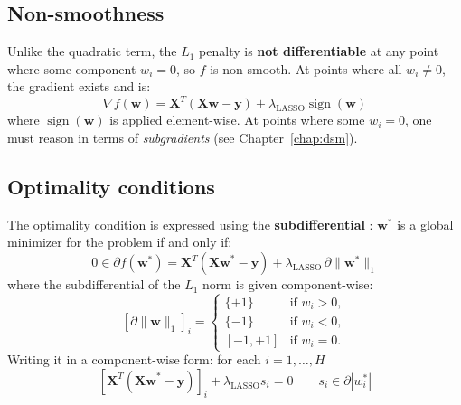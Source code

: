 \subsection{Non-smoothness}
Unlike the quadratic term, the $L_1$ penalty is \textbf{not differentiable} \cite[Slide 4]{frangioni-slides-nonsmooth} at any point where some component $w_i = 0$, so $f$ is non-smooth.
At points where all $w_i \neq 0$, the gradient exists and is:
$$
\nabla f(\mathbf{w}) = \mathbf{X}^T(\mathbf{Xw} - \mathbf{y}) + \lambda_{\text{LASSO}} \operatorname{sign}(\mathbf{w})
$$
where $\operatorname{sign}(\mathbf{w})$ is applied element-wise.
At points where some $w_i = 0$, one must reason in terms of
\textit{subgradients} (see Chapter~\ref{chap:dsm}).

\subsection{Optimality conditions}
\label{sec:intro_optimality}
The optimality condition is expressed
using the \textbf{subdifferential} \cite[Slide 5]{frangioni-slides-nonsmooth}: $\mathbf{w}^*$ is a global minimizer for the problem if and
only if:
$$
0 \in \partial f(\mathbf{w}^*) = \mathbf{X}^T(\mathbf{Xw}^* - \mathbf{y})
+ \lambda_{\text{LASSO}} \, \partial\|\mathbf{w}^*\|_1
$$
where the subdifferential of the $L_1$ norm is given component-wise:
$$
[\partial \|\mathbf{w}\|_1]_i =
\begin{cases}
    \{+1\}    & \text{if } w_i > 0,  \\
    \{-1\}    & \text{if } w_i < 0,  \\
    [-1, +1]  & \text{if } w_i = 0.
\end{cases}
$$
Writing it in a component-wise form: for each $i = 1, \ldots, H$
\begin{equation}
\label{eq:optimality}
\left[\mathbf{X}^T(\mathbf{Xw}^* - \mathbf{y})\right]_i + \lambda_{\text{LASSO}} s_i = 0
\qquad s_i \in \partial|w_i^*|
\end{equation}